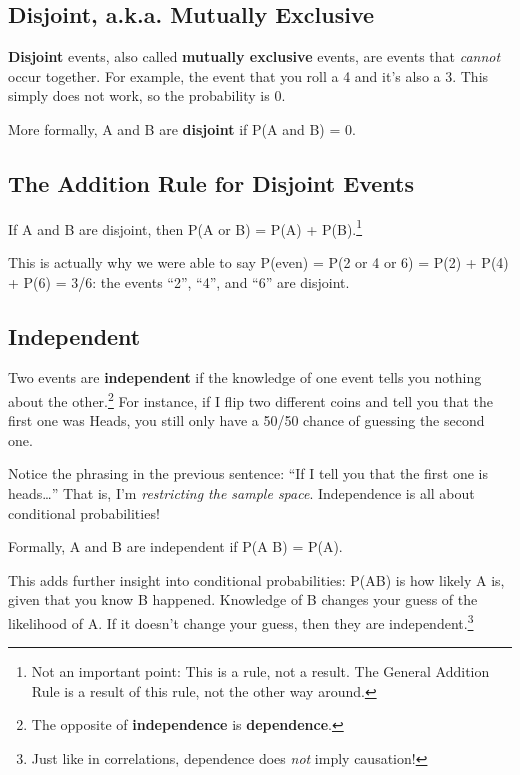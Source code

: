 \documentclass[
  letterpaper,
  DIV=11,
  numbers=noendperiod,
  oneside]{scrreprt}
\begin{document}
\hypertarget{disjoint-a.k.a.-mutually-exclusive}{%
\subsection{Disjoint, a.k.a. Mutually
Exclusive}\label{disjoint-a.k.a.-mutually-exclusive}}

\textbf{Disjoint} events, also called \textbf{mutually exclusive}
events, are events that \emph{cannot} occur together. For example, the
event that you roll a 4 and it's also a 3. This simply does not work, so
the probability is 0.

More formally, A and B are \textbf{disjoint} if P(A and B) = 0.

\hypertarget{the-addition-rule-for-disjoint-events}{%
\subsection{The Addition Rule for Disjoint
Events}\label{the-addition-rule-for-disjoint-events}}

If A and B are disjoint, then P(A or B) = P(A) + P(B).\footnote{Not an
  important point: This is a rule, not a result. The General Addition
  Rule is a result of this rule, not the other way around.}

This is actually why we were able to say P(even) = P(2 or 4 or 6) = P(2)
+ P(4) + P(6) = 3/6: the events ``2'', ``4'', and ``6'' are disjoint.

\hypertarget{independent}{%
\subsection{Independent}\label{independent}}

Two events are \textbf{independent} if the knowledge of one event tells
you nothing about the other.\footnote{The opposite of
  \textbf{independence} is \textbf{dependence}.} For instance, if I flip
two different coins and tell you that the first one was Heads, you still
only have a 50/50 chance of guessing the second one.

Notice the phrasing in the previous sentence: ``If I tell you that the
first one is heads\ldots{}'' That is, I'm \emph{restricting the sample
space}. Independence is all about conditional probabilities!

Formally, A and B are independent if P(A \textbar{} B) = P(A).

This adds further insight into conditional probabilities: P(A\textbar B)
is how likely A is, given that you know B happened. Knowledge of B
changes your guess of the likelihood of A. If it doesn't change your
guess, then they are independent.\footnote{Just like in correlations,
  dependence does \emph{not} imply causation!}
\end{document}
